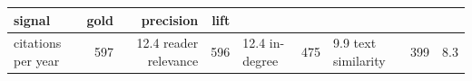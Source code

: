 \begin{tabular}{lrrr}
\toprule
signal & gold & precision & lift \\
\midrule
citations per year & 597 & 12.4%
reader relevance & 596 & 12.4%
in-degree & 475 & 9.9%
text similarity & 399 & 8.3%
\bottomrule
\end{tabular}
